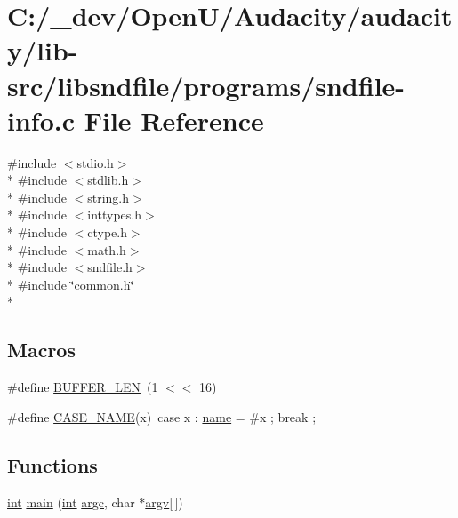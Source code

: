 \hypertarget{sndfile-info_8c}{}\section{C\+:/\+\_\+dev/\+Open\+U/\+Audacity/audacity/lib-\/src/libsndfile/programs/sndfile-\/info.c File Reference}
\label{sndfile-info_8c}
{\ttfamily \#include $<$stdio.\+h$>$}\\*
{\ttfamily \#include $<$stdlib.\+h$>$}\\*
{\ttfamily \#include $<$string.\+h$>$}\\*
{\ttfamily \#include $<$inttypes.\+h$>$}\\*
{\ttfamily \#include $<$ctype.\+h$>$}\\*
{\ttfamily \#include $<$math.\+h$>$}\\*
{\ttfamily \#include $<$sndfile.\+h$>$}\\*
{\ttfamily \#include \char`\"{}common.\+h\char`\"{}}\\*
\subsection*{Macros}
\begin{DoxyCompactItemize}
\item 
\#define \hyperlink{sndfile-info_8c_a46130dc86f2322714bba26960b64e7bb}{B\+U\+F\+F\+E\+R\+\_\+\+L\+EN}~(1 $<$$<$ 16)
\item 
\#define \hyperlink{sndfile-info_8c_aa183e95daaa8ef4e89e4434ba129f39d}{C\+A\+S\+E\+\_\+\+N\+A\+ME}(x)~case x \+: \hyperlink{lib_2expat_8h_a1b49b495b59f9e73205b69ad1a2965b0}{name} = \#x ; break ;
\end{DoxyCompactItemize}
\subsection*{Functions}
\begin{DoxyCompactItemize}
\item 
\hyperlink{xmltok_8h_a5a0d4a5641ce434f1d23533f2b2e6653}{int} \hyperlink{sndfile-info_8c_a0ddf1224851353fc92bfbff6f499fa97}{main} (\hyperlink{xmltok_8h_a5a0d4a5641ce434f1d23533f2b2e6653}{int} \hyperlink{cmdline_8c_aaffeb1bf2056ea44af5b5d0ee4d6ff07}{argc}, char $\ast$\hyperlink{cmdline_8c_ad407d5ba91709bd9b092003858600723}{argv}\mbox{[}$\,$\mbox{]})
\end{DoxyCompactItemize}


